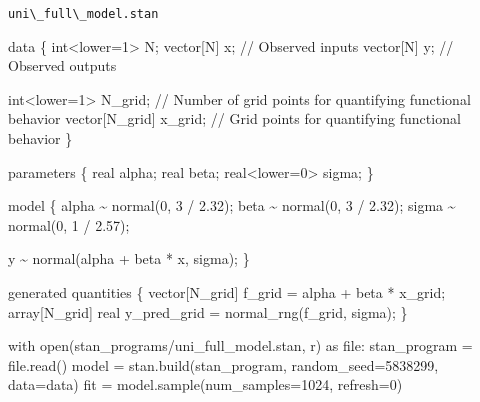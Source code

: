 \documentclass[
  letterpaper,
  DIV=11,
  numbers=noendperiod]{scrartcl}
\newenvironment{Shaded}{\begin{snugshade}}{\end{snugshade}}
\newcommand{\BuiltInTok}[1]{\textcolor[rgb]{0.00,0.23,0.31}{#1}}
\newcommand{\CommentTok}[1]{\textcolor[rgb]{0.37,0.37,0.37}{#1}}
\newcommand{\ControlFlowTok}[1]{\textcolor[rgb]{0.00,0.23,0.31}{#1}}
\newcommand{\DataTypeTok}[1]{\textcolor[rgb]{0.68,0.00,0.00}{#1}}
\newcommand{\DecValTok}[1]{\textcolor[rgb]{0.68,0.00,0.00}{#1}}
\newcommand{\FloatTok}[1]{\textcolor[rgb]{0.68,0.00,0.00}{#1}}
\newcommand{\ImportTok}[1]{\textcolor[rgb]{0.00,0.46,0.62}{#1}}
\newcommand{\KeywordTok}[1]{\textcolor[rgb]{0.00,0.23,0.31}{#1}}
\newcommand{\NormalTok}[1]{\textcolor[rgb]{0.00,0.23,0.31}{#1}}
\newcommand{\OperatorTok}[1]{\textcolor[rgb]{0.37,0.37,0.37}{#1}}
\newcommand{\StringTok}[1]{\textcolor[rgb]{0.13,0.47,0.30}{#1}}
\begin{document}
\begin{codelisting}

\caption{\texttt{uni\textbackslash\_full\textbackslash\_model.stan}}

\begin{Shaded}
\begin{Highlighting}[]
\KeywordTok{data}\NormalTok{ \{}
  \DataTypeTok{int}\NormalTok{\textless{}}\KeywordTok{lower}\NormalTok{=}\DecValTok{1}\NormalTok{\textgreater{} N;}
  \DataTypeTok{vector}\NormalTok{[N] x; }\CommentTok{// Observed inputs}
  \DataTypeTok{vector}\NormalTok{[N] y; }\CommentTok{// Observed outputs}
  
  \DataTypeTok{int}\NormalTok{\textless{}}\KeywordTok{lower}\NormalTok{=}\DecValTok{1}\NormalTok{\textgreater{} N\_grid; }\CommentTok{// Number of grid points for quantifying functional behavior}
  \DataTypeTok{vector}\NormalTok{[N\_grid] x\_grid; }\CommentTok{// Grid points for quantifying functional behavior}
\NormalTok{\}}

\KeywordTok{parameters}\NormalTok{ \{ }
  \DataTypeTok{real}\NormalTok{ alpha;}
  \DataTypeTok{real}\NormalTok{ beta;}
  \DataTypeTok{real}\NormalTok{\textless{}}\KeywordTok{lower}\NormalTok{=}\DecValTok{0}\NormalTok{\textgreater{} sigma;}
\NormalTok{\}}

\KeywordTok{model}\NormalTok{ \{}
\NormalTok{  alpha \textasciitilde{} normal(}\DecValTok{0}\NormalTok{, }\DecValTok{3}\NormalTok{ / }\FloatTok{2.32}\NormalTok{);}
\NormalTok{  beta \textasciitilde{} normal(}\DecValTok{0}\NormalTok{, }\DecValTok{3}\NormalTok{ / }\FloatTok{2.32}\NormalTok{);}
\NormalTok{  sigma \textasciitilde{} normal(}\DecValTok{0}\NormalTok{, }\DecValTok{1}\NormalTok{ / }\FloatTok{2.57}\NormalTok{);}
  
\NormalTok{  y \textasciitilde{} normal(alpha + beta * x, sigma);}
\NormalTok{\}}

\KeywordTok{generated quantities}\NormalTok{ \{}
  \DataTypeTok{vector}\NormalTok{[N\_grid] f\_grid = alpha + beta * x\_grid;}
  \DataTypeTok{array}\NormalTok{[N\_grid] }\DataTypeTok{real}\NormalTok{ y\_pred\_grid = normal\_rng(f\_grid, sigma);}
\NormalTok{\}}
\end{Highlighting}
\end{Shaded}

\end{codelisting}

\begin{Shaded}
\begin{Highlighting}[]
\ControlFlowTok{with} \BuiltInTok{open}\NormalTok{(}\StringTok{\textquotesingle{}stan\_programs/uni\_full\_model.stan\textquotesingle{}}\NormalTok{, }\StringTok{\textquotesingle{}r\textquotesingle{}}\NormalTok{) }\ImportTok{as} \BuiltInTok{file}\NormalTok{:}
\NormalTok{  stan\_program }\OperatorTok{=} \BuiltInTok{file}\NormalTok{.read()}
\NormalTok{model }\OperatorTok{=}\NormalTok{ stan.build(stan\_program, random\_seed}\OperatorTok{=}\DecValTok{5838299}\NormalTok{, data}\OperatorTok{=}\NormalTok{data)}
\NormalTok{fit }\OperatorTok{=}\NormalTok{ model.sample(num\_samples}\OperatorTok{=}\DecValTok{1024}\NormalTok{, refresh}\OperatorTok{=}\DecValTok{0}\NormalTok{)}
\end{Highlighting}
\end{Shaded}
\end{document}
